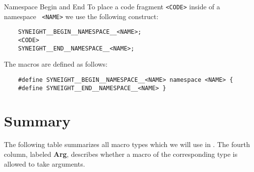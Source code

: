 \begin{rule*}{Namespace Begin and End}
  To place a code fragment {\tt <CODE>} inside of a namespace {\tt
  <NAME>} we use the following construct:
  \begin{verbatim}
    SYNEIGHT__BEGIN__NAMESPACE__<NAME>;
    <CODE>
    SYNEIGHT__END__NAMESPACE__<NAME>;
  \end{verbatim}
  The macros are defined as follows:
  \begin{verbatim}
    #define SYNEIGHT__BEGIN__NAMESPACE__<NAME> namespace <NAME> {
    #define SYNEIGHT__END__NAMESPACE__<NAME> }
  \end{verbatim}
\end{rule*}



\section{Summary}
\label{sec:summary}

The following table summarizes all macro types which we will use in
\SYNEIGHT. The fourth column, labeled \textbf{Arg}, describes
whether a macro of the corresponding type is allowed to take
arguments.

